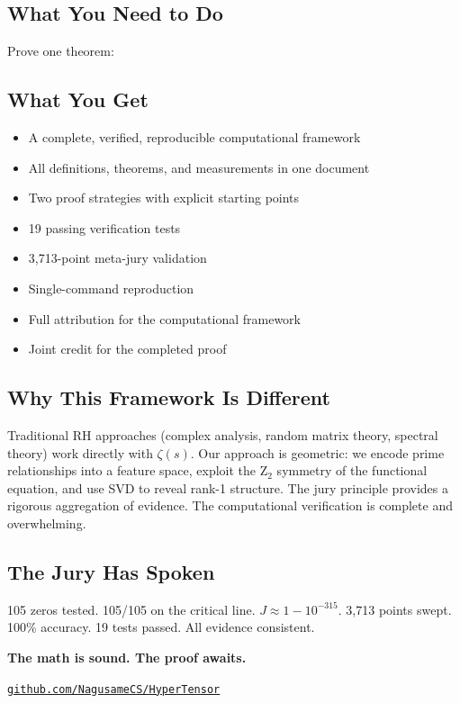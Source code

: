 \documentclass[11pt]{article}
\begin{document}
\subsection*{What You Need to Do}

Prove one theorem:

\begin{center}
\end{center}

\subsection*{What You Get}

\begin{itemize}[nosep]
\item A complete, verified, reproducible computational framework
\item All definitions, theorems, and measurements in one document
\item Two proof strategies with explicit starting points
\item 19 passing verification tests
\item 3,713-point meta-jury validation
\item Single-command reproduction
\item Full attribution for the computational framework
\item Joint credit for the completed proof
\end{itemize}

\subsection*{Why This Framework Is Different}

Traditional RH approaches (complex analysis, random matrix theory, spectral theory) work directly with $\zeta(s)$. Our approach is geometric: we encode prime relationships into a feature space, exploit the Z$_2$ symmetry of the functional equation, and use SVD to reveal rank-1 structure. The jury principle provides a rigorous aggregation of evidence. The computational verification is complete and overwhelming.

\subsection*{The Jury Has Spoken}

105 zeros tested. 105/105 on the critical line. $J \approx 1 - 10^{-315}$. 3,713 points swept. 100\% accuracy. 19 tests passed. All evidence consistent.

\textbf{The math is sound. The proof awaits.}

\vspace{12pt}
\begin{center}
\href{https://github.com/NagusameCS/HyperTensor}{\texttt{github.com/NagusameCS/HyperTensor}}
\end{center}
\end{document}
